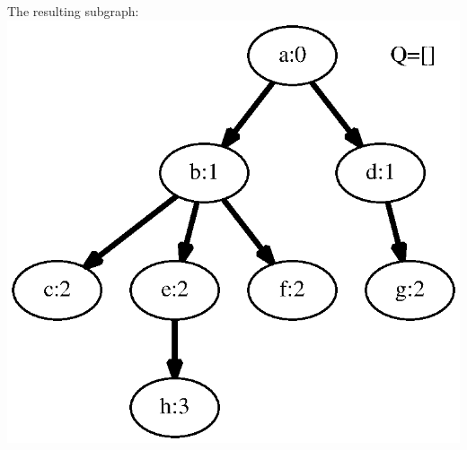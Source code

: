 \documentclass{article}
\begin{document}
\begin{minipage}[b][.25\textheight]{0.22727272727272727\linewidth}
The resulting subgraph: 
\includegraphics[height=.25\textheight]{bfs_directed_classroom_09.eps}
\end{minipage}
\end{document}

